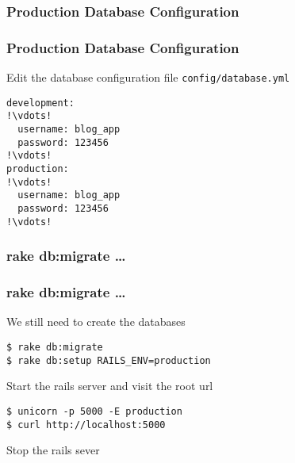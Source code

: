 \subsubsection{Production Database Configuration}
\begin{frame}[fragile]
\frametitle{Production Database Configuration}
Edit the database configuration file \texttt{config/database.yml}

\lstset{language=shell, escapechar=!}
\begin{lstlisting}[escapechar=!]
development:
!\vdots!
  username: blog_app
  password: 123456
!\vdots!
production:
!\vdots!
  username: blog_app
  password: 123456
!\vdots!
\end{lstlisting}
\end{frame}
\subsubsection{rake db:migrate \dots}
\begin{frame}[fragile]
\frametitle{rake db:migrate \dots}
We still need to create the databases
\lstset{language=shell, escapechar=!}
\begin{lstlisting}[escapechar=!]
$ rake db:migrate
$ rake db:setup RAILS_ENV=production
\end{lstlisting}

Start the rails server and visit the root url

\lstset{language=shell, escapechar=!}
\begin{lstlisting}[escapechar=!]
$ unicorn -p 5000 -E production
$ curl http://localhost:5000
\end{lstlisting}

Stop the rails sever

\end{frame}



